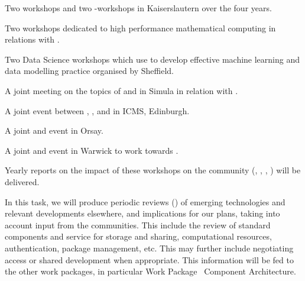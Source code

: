 \begin{workpackage}
\begin{tasklist}
\begin{task}[title=Community Building: Development Workshops, lead=PS,PM=24, partners={UB,UK,SR,SA,USH,UG}, id=devel-workshops, wphases=0-48, issue=26]
\begin{compactitem}
\item Two \Singular workshops and two \GAP-\Singular workshops in Kaiserslautern
  over the four years.

\item Two workshops dedicated to high performance mathematical
  computing in relations with .

\item Two Data Science workshops which use \TheProject to develop effective machine learning and data modelling practice organised by Sheffield.

\item A joint meeting on the topics of \SMC and \Jupyter in Simula in
  relation with .

\item A joint event between \GAP, \Sage, and \Singular in ICMS,
  Edinburgh.

\item A joint \Jupyter and \Sage event in Orsay.

\item A joint \LMFDB and \Sage event in Warwick to work towards
  .

\end{compactitem}

Yearly reports on the impact of these workshops on the community (,
, ,
) will be delivered.
\end{task}


\begin{task}[title=Reviewing emerging technologies, id=tech-review, lead=PS, partners={SA,USO,USH,US,UV,UB,SR,XFEL},PM=10, wphases=0-48,issue=27]
  In this task, we will produce periodic reviews () of emerging
  technologies and relevant developments elsewhere, and implications
  for our plans, taking into account input from the communities. This
  include the review of standard components and service for storage
  and sharing, computational resources, authentication, package
  management, etc. This may further include negotiating access or
  shared development when appropriate. This information will be fed to
  the other work packages, in particular Work
  Package~ Component Architecture.
\end{task}



\end{tasklist}
\end{workpackage}
